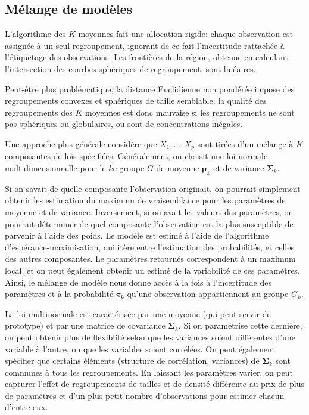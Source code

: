 \documentclass[
  11pt,
  letterpaper,
]{scrbook}
\theoremstyle{definition}
\theoremstyle{remark}
\begin{document}
\hypertarget{muxe9lange-de-moduxe8les}{%
\subsection{Mélange de modèles}\label{muxe9lange-de-moduxe8les}}

L'algorithme des \(K\)-moyennes fait une allocation rigide: chaque
observation est assignée à un seul regroupement, ignorant de ce fait
l'incertitude rattachée à l'étiquetage des observations. Les frontières
de la région, obtenue en calculant l'intersection des courbes sphériques
de regroupement, sont linéaires.

Peut-être plus problématique, la distance Euclidienne non pondérée
impose des regroupements convexes et sphériques de taille semblable: la
qualité des regroupements des \(K\) moyennes est donc mauvaise si les
regroupements ne sont pas sphériques ou globulaires, ou sont de
concentrations inégales.

Une approche plus générale considère que \(X_1, \ldots, X_p\) sont
tirées d'un mélange à \(K\) composantes de lois spécifiées.
Généralement, on choisit une loi normale multidimensionnelle pour le
\(k\)e groupe \(G\) de moyenne \(\boldsymbol{\mu}_k\) et de variance
\(\boldsymbol{\Sigma}_k\).

Si on savait de quelle composante l'observation originait, on pourrait
simplement obtenir les estimation du maximum de vraisemblance pour les
paramètres de moyenne et de variance. Inversement, si on avait les
valeurs des paramètres, on pourrait déterminer de quel composante
l'observation est la plus susceptible de parvenir à l'aide des poids. Le
modèle est estimé à l'aide de l'algorithme d'espérance-maximisation, qui
itère entre l'estimation des probabilités, et celles des autres
composantes. Le paramètres retournés correspondent à un maximum local,
et on peut également obtenir un estimé de la variabilité de ces
paramètres. Ainsi, le mélange de modèle nous donne accès à la fois à
l'incertitude des paramètres et à la probabilité \(\pi_k\) qu'une
observation appartiennent au groupe \(G_k\).

La loi multinormale est caractérisée par une moyenne (qui peut servir de
prototype) et par une matrice de covariance \(\boldsymbol{\Sigma}_k\).
Si on paramétrise cette dernière, on peut obtenir plus de flexiblité
selon que les variances soient différentes d'une variable à l'autre, ou
que les variables soient corrélées. On peut également spécifier que
certains éléments (structure de corrélation, variances) de
\(\boldsymbol{\Sigma}_k\) sont communes à tous les regroupements. En
laissant les paramètres varier, on peut capturer l'effet de
regroupements de tailles et de densité différente au prix de plus de
paramètres et d'un plus petit nombre d'observations pour estimer chacun
d'entre eux.
\end{document}
